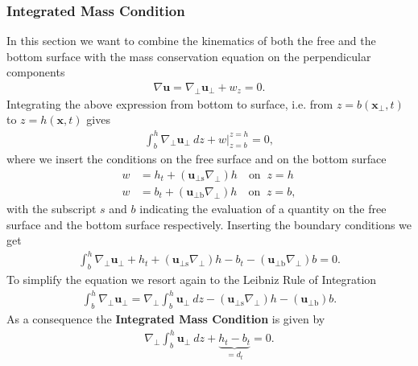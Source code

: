 \subsubsection{Integrated Mass Condition}
In this section we want to combine the kinematics of both the free and the
bottom surface with the mass conservation equation on the perpendicular
components
\begin{align}
    \nabla \mathbf{u} = \nabla_\perp \mathbf{u}_\perp + w_z = 0 .
\end{align}
Integrating the above expression from bottom to surface, i.e. from
$z=b(\mathbf{x}_\perp,t)$ to $z = h (\mathbf{x},t)$ gives
\begin{align}
    \int_b^h \nabla_\perp \mathbf{u}_\perp\ dz + w\bigg|_{z=b}^{z=h} = 0,
\end{align}
where we insert the conditions on the free surface and on the bottom surface
\begin{align}
    w &= h_t + (\mathbf{u}_{\perp \text{s}} \nabla_\perp) h \quad
    \text{on}\;\; z = h\\
    w &= b_t + (\mathbf{u}_{\perp \text{b}} \nabla_\perp) h \quad
    \text{on}\;\; z =b,
\end{align}
with the subscript $s$ and $b$ indicating the evaluation of a quantity
on the free surface and the bottom surface respectively. Inserting the
boundary conditions we get
\begin{align}
    \int_b^h \nabla_\perp \mathbf{u}_\perp
    + h_t + (\mathbf{u}_{\perp \text{s}} \nabla_\perp) h
    - b_t - (\mathbf{u}_{\perp \text{b}} \nabla_\perp) b= 0.
\end{align}
To simplify the equation we resort again to the Leibniz Rule of Integration
\begin{align}
     \int_b^h \nabla_\perp\mathbf{u}_\perp =
    \nabla_\perp \int_b^h \mathbf{u}_\perp\ dz - (\mathbf{u}_{\perp \text{s}}
    \nabla_\perp)h - (\mathbf{u}_{\perp \text{b}})b.
\end{align}
As a consequence the \textbf{Integrated Mass Condition} is given by
\begin{align}
    \nabla_\perp \int_b^h \mathbf{u}_\perp\ dz  + \underbrace{h_t -
    b_t}_{=d_t} = 0.
\end{align}
